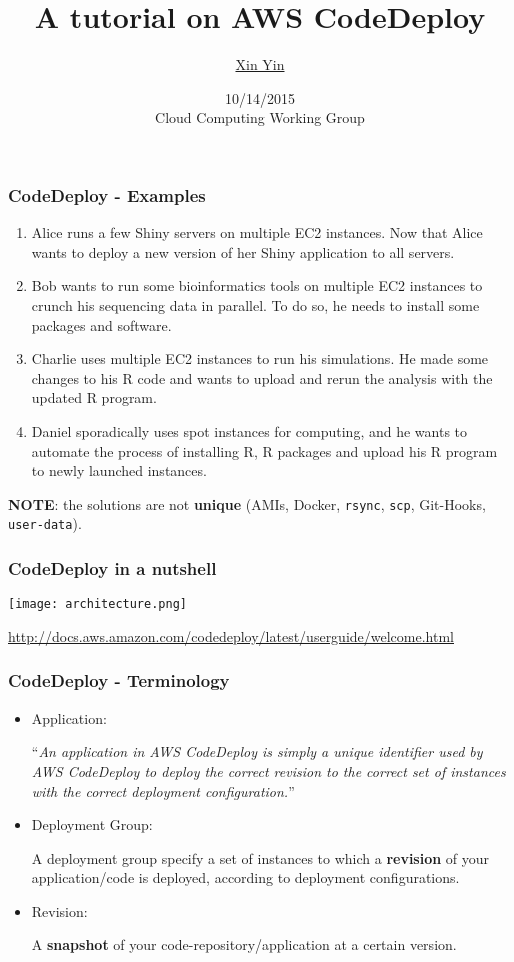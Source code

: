 \documentclass[10pt]{beamer}
\title{A tutorial on AWS CodeDeploy}
\author{\underline{Xin Yin}}
\date{\scriptsize 10/14/2015\\
Cloud Computing Working Group}
\begin{document}
\frame{\titlepage}

\begin{frame}
    \frametitle{CodeDeploy - Examples}
    \begin{enumerate}
        \item Alice runs a few Shiny servers on multiple EC2 instances. Now that Alice wants to deploy a new version of her Shiny application to all servers.
        \item Bob wants to run some bioinformatics tools on multiple EC2 instances to crunch his sequencing data in parallel. To do so, he needs to install some packages and software.
        \item Charlie uses multiple EC2 instances to run his simulations. He made some changes to his R code and wants to upload and rerun the analysis with the updated R program.
        \item Daniel sporadically uses spot instances for computing, and he wants to automate the process of installing R, R packages and upload his R program to newly launched instances.
    \end{enumerate}

    \vspace{0.5in}
    \pause
    {\bf NOTE}: the solutions are not {\bf unique} (AMIs, Docker, {\tt rsync}, {\tt scp}, Git-Hooks, {\tt user-data}).
\end{frame}

\begin{frame}
    \frametitle{CodeDeploy in a nutshell}
    
    \texttt{[image: architecture.png]}

    {\tiny \url{http://docs.aws.amazon.com/codedeploy/latest/userguide/welcome.html}}
\end{frame}

\begin{frame}
    \frametitle{CodeDeploy - Terminology}
    \begin{itemize}
        \item Application: 

            ``{\it An application in AWS CodeDeploy is simply a unique identifier used by AWS CodeDeploy to deploy the correct revision to the correct set of instances with the correct deployment configuration.}''
        \item Deployment Group: 

            A deployment group specify a set of instances to which a {\bf revision} of your application/code is deployed, according to deployment configurations.
        \item Revision:

            A {\bf snapshot} of your code-repository/application at a certain version.
    \end{itemize}
\end{frame}
\end{document}
